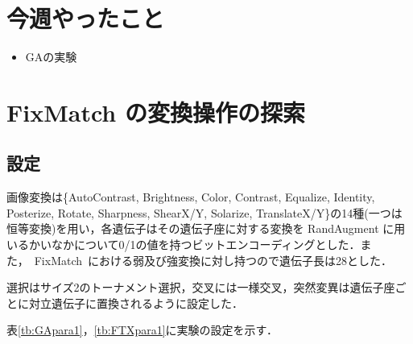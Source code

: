 \documentclass[twocolumn]{jarticle}     %
\begin{document}


\section{今週やったこと}

\begin{itemize}
	\item GAの実験
\end{itemize}

\section{FixMatch の変換操作の探索}
\subsection{設定}
画像変換は\{AutoContrast, Brightness, Color, Contrast, Equalize, Identity, Posterize, Rotate, Sharpness, ShearX/Y, Solarize, TranslateX/Y\}の14種(一つは恒等変換)を用い，各遺伝子はその遺伝子座に対する変換を RandAugment に用いるかいなかについて0/1の値を持つビットエンコーディングとした．また，\ FixMatch\ における弱及び強変換に対し持つので遺伝子長は28とした．

選択はサイズ2のトーナメント選択，交叉には一様交叉，突然変異は遺伝子座ごとに対立遺伝子に置換されるように設定した．

表\ref{tb:GApara1}，\ref{tb:FTXpara1}に実験の設定を示す．

\begin{table}[h]
	\centering
	\caption{実験１のGAの設定\label{tb:GApara1}}
\end{table}
\end{document}
